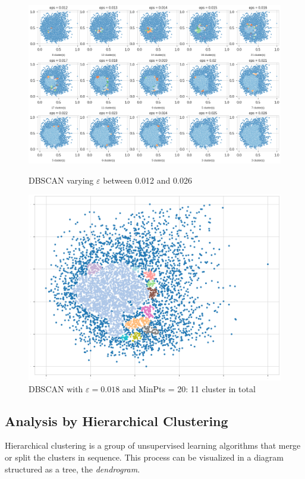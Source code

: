 \documentclass[a4paper,11pt,dvipsnames]{article}
\begin{document}
\begin{figure}[h]
\centering
    \begin{minipage}[b]{.59\linewidth}
    \includegraphics[width=\textwidth]{dibi.png}
     \caption{DBSCAN varying $\varepsilon$ between 0.012 and 0.026}
    \label{fig:vareps}
    \end{minipage}
    \hfil
    \begin{minipage}[b]{.4\linewidth}
    \centering
    \includegraphics[width=\textwidth]{dbscan.png}
    \caption{DBSCAN with $\varepsilon= 0.018$ and MinPts = 20: 11 cluster in total}
    \label{fig:dbscan}
    \end{minipage}
\end{figure}



\subsection{Analysis by Hierarchical Clustering}
Hierarchical clustering is a group of unsupervised learning algorithms that merge or split the clusters in sequence. This process can be visualized in a diagram structured as a tree, the \textit{dendrogram}. 
\end{document}
